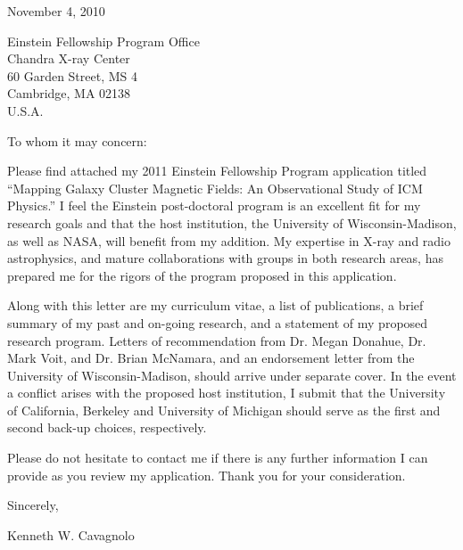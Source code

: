\documentclass[letterpaper,12pt]{article}
\begin{document}
November 4, 2010

Einstein Fellowship Program Office\\
Chandra X-ray Center\\
60 Garden Street, MS 4\\
Cambridge, MA 02138\\
U.S.A.

To whom it may concern:

Please find attached my 2011 Einstein Fellowship Program application
titled ``Mapping Galaxy Cluster Magnetic Fields: An Observational
Study of ICM Physics.'' I feel the Einstein post-doctoral program is
an excellent fit for my research goals and that the host institution,
the University of Wisconsin-Madison, as well as NASA, will benefit
from my addition. My expertise in X-ray and radio astrophysics, and
mature collaborations with groups in both research areas, has prepared
me for the rigors of the program proposed in this application.

Along with this letter are my curriculum vitae, a list of
publications, a brief summary of my past and on-going research, and a
statement of my proposed research program. Letters of recommendation
from Dr. Megan Donahue, Dr. Mark Voit, and Dr. Brian McNamara, and an
endorsement letter from the University of Wisconsin-Madison, should
arrive under separate cover. In the event a conflict arises with the
proposed host institution, I submit that the University of California,
Berkeley and University of Michigan should serve as the first and
second back-up choices, respectively.

Please do not hesitate to contact me if there is any further
information I can provide as you review my application. Thank you for
your consideration.

Sincerely,\\
\begin{minipage}{7.5in}
\end{minipage}
Kenneth W. Cavagnolo
\end{document}
